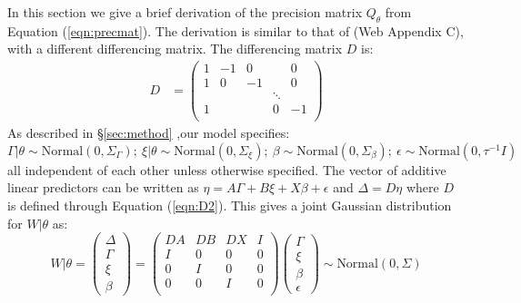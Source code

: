 \documentclass[ba]{imsart}
\begin{document}
In this section we give a brief derivation of the precision matrix $Q_{\theta}$ from Equation (\ref{eqn:precmat}). The derivation is similar to that of \cite{casecross} (Web Appendix C), with a different differencing matrix. The differencing matrix $D$ is:
\begin{equation}\begin{aligned}\label{eqn:D2}
D &= \begin{pmatrix}
1 & -1 & 0 & & 0 \\
1 & 0 & -1 & & 0 \\
  &    &  & \ddots  &   \\
1 &    &       & 0 & -1 \\
\end{pmatrix}
\end{aligned}\end{equation}
As described in \S\ref{sec:method} ,our model specifies:
\begin{equation*}
\Gamma|\theta \sim \text{Normal}\left( 0,\Sigma_{\Gamma}\right); \ \xi|\theta \sim \text{Normal}\left( 0,\Sigma_{\xi}\right); \ \beta \sim \text{Normal}\left( 0,\Sigma_{\beta}\right); \ \epsilon \sim \text{Normal}\left( 0,\tau^{-1}I\right)
\end{equation*}
all independent of each other unless otherwise specified. The vector of additive linear predictors can be written as $\eta = A\Gamma + B\xi + X\beta + \epsilon$ and $\Delta = D\eta$ where $D$ is defined through Equation (\ref{eqn:D2}). This gives a joint Gaussian distribution for $W|\theta$ as:
\begin{equation*}
W|\theta = \begin{pmatrix} \Delta \\ \Gamma \\ \xi \\\beta \end{pmatrix} = \begin{pmatrix} DA & DB & DX & I \\ I & 0 & 0 & 0 \\ 0 & I & 0 & 0 \\ 0 & 0 & I & 0 \\ \end{pmatrix}\begin{pmatrix}\Gamma\\ \xi \\ \beta \\ \epsilon \end{pmatrix} 
\sim \text{Normal}\left( 0,\Sigma\right)
\end{equation*}
\end{document}
